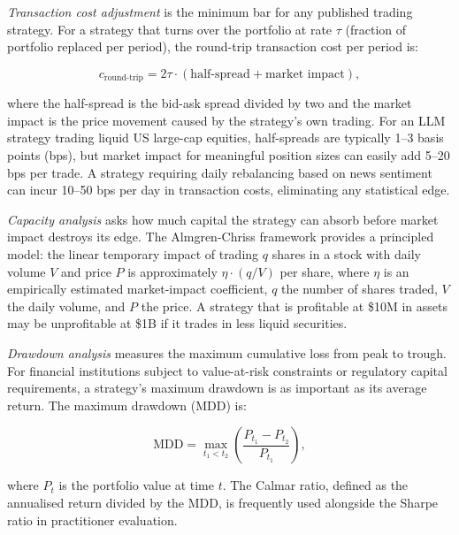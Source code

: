 \emph{Transaction cost adjustment} is the minimum bar for any published trading
strategy. For a strategy that turns over the portfolio at rate $\tau$ (fraction of
portfolio replaced per period), the round-trip transaction cost per period is:

\begin{equation}
  c_{\text{round-trip}} = 2 \tau \cdot (\text{half-spread} + \text{market impact}),
  \label{eq:ch13-transaction-cost}
\end{equation}

where the half-spread is the bid-ask spread divided by two and the market impact
is the price movement caused by the strategy's own trading. For an LLM strategy
trading liquid US large-cap equities, half-spreads are typically 1--3 basis points
(bps), but market impact for meaningful position sizes can easily add 5--20 bps per
trade. A strategy requiring daily rebalancing based on news sentiment can incur 10--50
bps per day in transaction costs, eliminating any statistical edge.

\emph{Capacity analysis} asks how much capital the strategy can absorb before market
impact destroys its edge. The Almgren-Chriss framework \citep{almgren2001optimal} provides a principled model:
the linear temporary impact of trading $q$ shares in a stock with daily volume $V$
and price $P$ is approximately $\eta \cdot (q / V)$ per share, where $\eta$ is an
empirically estimated market-impact coefficient, $q$ the number of shares traded,
$V$ the daily volume, and $P$ the price. A strategy that is profitable at
\$10M in assets may be unprofitable at \$1B if it trades in less liquid securities.

\emph{Drawdown analysis} measures the maximum cumulative loss from peak to trough.
For financial institutions subject to value-at-risk constraints or regulatory capital
requirements, a strategy's maximum drawdown is as important as its average return.
The maximum drawdown (MDD) is:

\begin{equation}
  \text{MDD} = \max_{t_1 < t_2} \left( \frac{P_{t_1} - P_{t_2}}{P_{t_1}} \right),
  \label{eq:ch13-max-drawdown}
\end{equation}

where $P_t$ is the portfolio value at time $t$. The Calmar ratio, defined as the
annualised return divided by the MDD, is frequently used alongside the Sharpe ratio
in practitioner evaluation.

